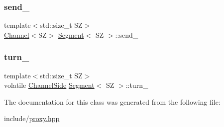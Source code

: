 \subsubsection{\texorpdfstring{send\+\_\+}{send\_}}
{\footnotesize\ttfamily template$<$std\+::size\+\_\+t SZ$>$ \\
\hyperlink{classChannel}{Channel}$<$SZ$>$ \hyperlink{classSegment}{Segment}$<$ SZ $>$\+::send\+\_\+\hspace{0.3cm}{\ttfamily [private]}}

\mbox{\label{classSegment_aa621c3ec3839a512ed61dd46406898de}} 
\subsubsection{\texorpdfstring{turn\+\_\+}{turn\_}}
{\footnotesize\ttfamily template$<$std\+::size\+\_\+t SZ$>$ \\
volatile \hyperlink{proxy_8hpp_a249fda9ad200a554304ecf8de90d6877}{Channel\+Side} \hyperlink{classSegment}{Segment}$<$ SZ $>$\+::turn\+\_\+\hspace{0.3cm}{\ttfamily [private]}}



The documentation for this class was generated from the following file\+:\begin{DoxyCompactItemize}
\item 
include/\hyperlink{proxy_8hpp}{proxy.\+hpp}\end{DoxyCompactItemize}
